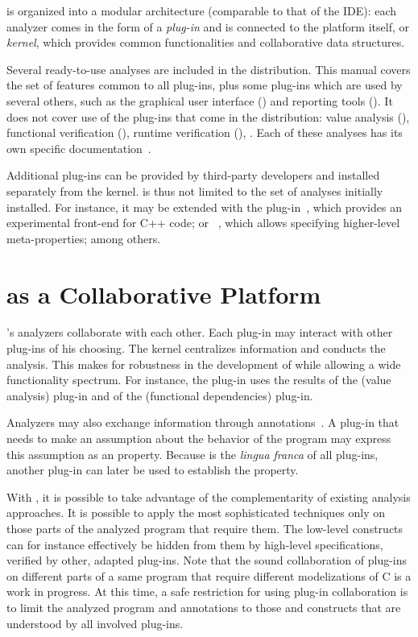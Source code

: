 \FramaC is organized into a modular architecture (comparable to that of the
 IDE): each analyzer comes in the form of a
\emph{plug-in} and is connected to the platform itself, or \emph{kernel}, which
provides common functionalities and collaborative data structures.

Several ready-to-use analyses are included in the \FramaC distribution. This
manual covers the set of features common to all plug-ins, plus some plug-ins
which are used by several others, such as the graphical user interface
(\GUI) and reporting tools (\Report).
It does not cover use of the plug-ins that come in the \FramaC
distribution: value analysis (\Value), functional verification (\WP),
runtime verification (), \etc.
Each of these analyses has its own specific
documentation~\cite{value,wp,eacsl}.

Additional plug-ins can be provided by third-party developers and installed
separately from the kernel. \FramaC is thus not limited to the set of analyses
initially installed. For instance, it may be extended with the 
plug-in~\cite{framaclang}, which provides an experimental front-end for C++ code;
or ~\cite{metacsl}, which allows specifying higher-level
meta-properties; among others.

\section{\FramaC as a Collaborative Platform}

\FramaC's analyzers collaborate with each other.
Each plug-in may interact with other plug-ins of his choosing.
The kernel centralizes information and conducts the
analysis. This makes for robustness in the development of \FramaC while
allowing a wide functionality spectrum.
For instance, the \Slicing plug-in uses the results
of the \Eva (value analysis) plug-in and of the \From (functional dependencies)
plug-in.

Analyzers may also exchange information
through \acsl annotations~\cite{acsl}. A plug-in that needs to
make an assumption about the behavior of the program may express
this assumption as an \acsl property. Because \acsl is the
{\em lingua franca} of all plug-ins, another plug-in can later
be used to establish the property.

With \FramaC, it is possible to take advantage of the
complementarity of existing analysis approaches.
It is possible to apply the most sophisticated techniques
only on those parts of the analyzed program that require them.
The low-level constructs can for instance effectively be hidden
from them by high-level specifications, verified by other,
adapted plug-ins.
Note that the sound collaboration of plug-ins on different parts of
a same program that require different modelizations of C is
a work in progress. At this time, a safe restriction
for using plug-in collaboration is to limit the analyzed
program and annotations to those \C and \acsl constructs
that are understood by all involved plug-ins.


